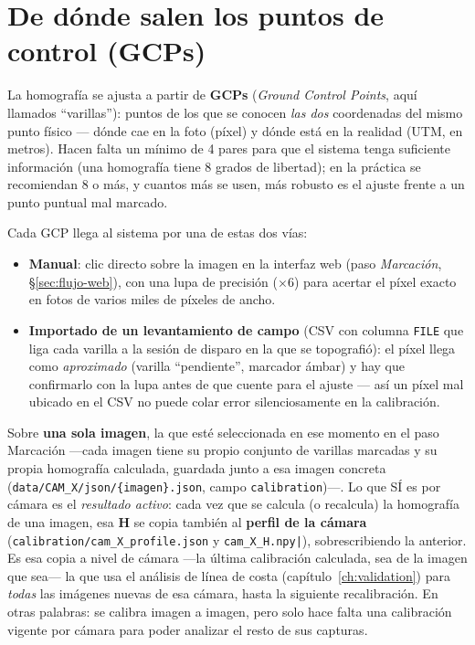 \section{De dónde salen los puntos de control (GCPs)}

La homografía se ajusta a partir de \textbf{GCPs} (\emph{Ground Control Points}, aquí llamados
``varillas''): puntos de los que se conocen \emph{las dos} coordenadas del mismo punto físico —
dónde cae en la foto (píxel) y dónde está en la realidad (UTM, en metros). Hacen falta un
mínimo de 4 pares para que el sistema tenga suficiente información (una homografía tiene 8
grados de libertad); en la práctica se recomiendan 8 o más, y cuantos más se usen, más robusto
es el ajuste frente a un punto puntual mal marcado.

Cada GCP llega al sistema por una de estas dos vías:

\begin{itemize}[leftmargin=1.5em]
  \item \textbf{Manual}: clic directo sobre la imagen en la interfaz web (paso \emph{Marcación},
        \S\ref{sec:flujo-web}), con una lupa de precisión ($\times6$) para acertar el píxel exacto
        en fotos de varios miles de píxeles de ancho.
  \item \textbf{Importado de un levantamiento de campo} (CSV con columna \texttt{FILE} que liga
        cada varilla a la sesión de disparo en la que se topografió): el píxel llega como
        \emph{aproximado} (varilla ``pendiente'', marcador ámbar) y hay que confirmarlo con la
        lupa antes de que cuente para el ajuste — así un píxel mal ubicado en el CSV no puede
        colar error silenciosamente en la calibración.
\end{itemize}

\begin{infobox}
Sobre \textbf{una sola imagen}, la que esté seleccionada en ese momento en el paso Marcación
—cada imagen tiene su propio conjunto de varillas marcadas y su propia homografía calculada,
guardada junto a esa imagen concreta (\texttt{data/CAM\_X/json/\{imagen\}.json}, campo
\texttt{calibration})—. Lo que SÍ es por cámara es el \emph{resultado activo}: cada vez que se
calcula (o recalcula) la homografía de una imagen, esa $\mathbf{H}$ se copia también al
\textbf{perfil de la cámara} (\texttt{calibration/cam\_X\_profile.json} y
\texttt{cam\_X\_H.npy|}), sobrescribiendo la anterior. Es esa copia a nivel de cámara —la
última calibración calculada, sea de la imagen que sea— la que usa el análisis de línea de
costa (capítulo~\ref{ch:validation}) para \emph{todas} las imágenes nuevas de esa cámara, hasta
la siguiente recalibración. En otras palabras: se calibra imagen a imagen, pero solo hace falta
una calibración vigente por cámara para poder analizar el resto de sus capturas.
\end{infobox}

